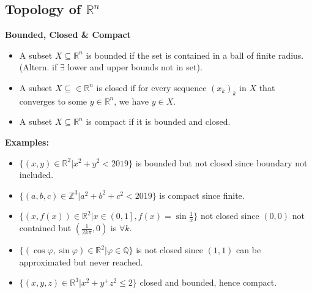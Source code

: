 \documentclass[25pt]{sciposter}
\newcommand{\R}{\mathbb{R}}
\newenvironment{method}[1]{\begin{mdframed}[backgroundcolor=blue!10,innertopmargin=15pt, innerbottommargin=15pt, nobreak=true]
		\textbf{#1 }
	}
	{ 
	\end{mdframed}
}
\begin{document}
\begin{multicols}{3}
\section*{Topology of $\R^n$}


\begin{method}{Bounded, Closed \& Compact}
	\begin{itemize}
		\item A subset $X\subseteq \R^n$ is bounded if the set is contained in a ball of finite radius. (Altern. if $\exists$ lower and upper bounds not in set).
		\item A subset $X \subseteq \in \R^n$ is closed if for every sequence $(x_k)_k$ in $X$ that converges to some $y\in \R^n$, we have $y \in X$.
		\item A subset $X \subseteq \R^n$ is compact if it is bounded and closed.
	\end{itemize}
\end{method}
\textbf{Examples:}
\begin{itemize}
	\item $\{(x,y) \in \R^2 | x^2 + y^2 < 2019\}$ is bounded but not closed since boundary not included.
	
	\item $\{ (a,b,c) \in \mathbb{Z}^3  | a^2 + b^2 + c^2 < 2019 \}$ is compact since finite.
	
	\item $\{(x,f(x)) \in \R^2  | x \in \left(0,1\right], f(x) = \sin\frac{1}{x} \}$ not closed since $(0,0)$ not contained but $(\frac{1}{2k\pi},0)$ is $\forall k$.
	
	\item $\{ (\cos\varphi,\sin\varphi) \in\R^2 | \varphi \in \mathbb{Q} \}$ is not closed since $(1,1)$ can be approximated but never reached.
	
	\item $\{(x,y,z) \in \R^3 | x^2 + y^ + z^2 \leq 2 \}$ closed and bounded, hence compact.
\end{itemize}


\end{multicols}
\end{document}
